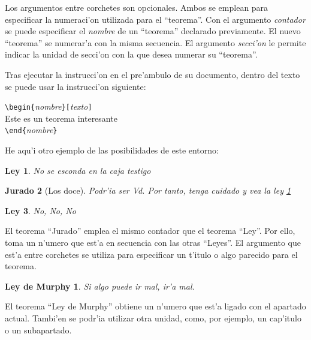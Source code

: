 Los argumentos entre corchetes son opcionales. Ambos se emplean para
especificar la numeraci'on utilizada para el ``teorema''. Con el
argumento \emph{contador} se puede especificar el \emph{nombre} de un
``teorema'' declarado previamente. El nuevo ``teorema'' se numerar'a
con la misma secuencia. El argumento \emph{secci'on} le permite
indicar la unidad de secci'on con la que desea numerar su ``teorema''.

Tras ejecutar la instrucci'on  en el pre'ambulo de su
documento, dentro del texto se puede usar la instrucci'on siguiente:


\begin{code}
\verb|\begin{|\emph{nombre}\verb|}[|\emph{texto}\verb|]|\\
Este es un teorema interesante\\
\verb|\end{|\emph{nombre}\verb|}|     
\end{code}

He aqu'i otro ejemplo de las posibilidades de este entorno:

\begin{example}
\newtheorem{ley}{Ley}
\newtheorem{jurado}[ley]{Jurado}
\begin{ley} \label{law:box}
No se esconda en la caja testigo
\end{ley}
\begin{jurado}[Los doce]
Podr'ia ser Vd. Por tanto, tenga
cuidado y vea la ley
\ref{law:box}\end{jurado}
\begin{ley}No, No, No\end{ley}
\end{example}

El teorema ``Jurado'' emplea el mismo contador que el teorema ``Ley''.
Por ello, toma un n'umero que est'a en secuencia con las otras
``Leyes''. El argumento que est'a entre corchetes se utiliza para
especificar un t'itulo o algo parecido para el teorema.

\begin{example}
\newtheorem{mur}{Ley de Murphy}[section]
\begin{mur} Si algo puede ir mal,
ir'a mal.
\end{mur}
\end{example}

El teorema ``Ley de Murphy'' obtiene un n'umero que est'a ligado con
el apartado actual. Tambi'en se podr'ia utilizar otra unidad, como,
por ejemplo, un cap'itulo o un subapartado.

